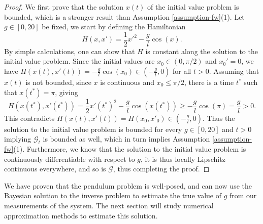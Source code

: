 \begin{proof}
  We first prove that the solution $x(t)$ of the initial value problem is bounded, which is a stronger result than Assumption \ref{assumption-fw}(1). Let $g \in [0, 20]$ be fixed, we start by defining the Hamiltonian
  \begin{equation*}
    H(x, x') = \frac12 x'^2 - \frac{g}{l}\cos(x).
  \end{equation*}
  By simple calculations, one can show that $H$ is constant along the solution to the initial value problem. Since the initial values are $x_0 \in (0, \pi/2)$ and $x_0' = 0$, we have $H(x(t), x'(t)) = -\frac{g}{l}\cos(x_0) \in (-\frac{g}{l}, 0)$ for all $t > 0$. Assuming that $x(t)$ is not bounded, since $x$ is continuous and $x_0 \le \pi/2$, there is a time $t^*$ such that $x(t^*) = \pi$, giving
  \begin{equation*}
    H(x(t^*), x'(t^*)) = \frac12 x'(t^*)^2 - \frac{g}{l}\cos(x(t^*)) \ge -\frac{g}{l}\cos(\pi) = \frac{g}{l} > 0.
  \end{equation*}
  This contradicts $H(x(t), x'(t)) = H(x_0, x'_0) \in (-\frac{g}{l}, 0)$. Thus the solution to the initial value problem is bounded for every $g \in [0, 20]$ and $t > 0$ implying $\mathcal{G}_t$ is bounded as well, which in turn implies Assumption \ref{assumption-fw}(1).
  Furthermore, we know that the solution to the initial value problem is continuously differentiable with respect to $g$, it is thus locally Lipschitz continuous everywhere, and so is $\mathcal{G}$, thus completing the proof.
\end{proof}

We have proven that the pendulum problem is well-posed, and can now use the Bayesian solution to the inverse problem to estimate the true value of $g$ from our measurements of the system. The next section will study numerical approximation methods to estimate this solution.

